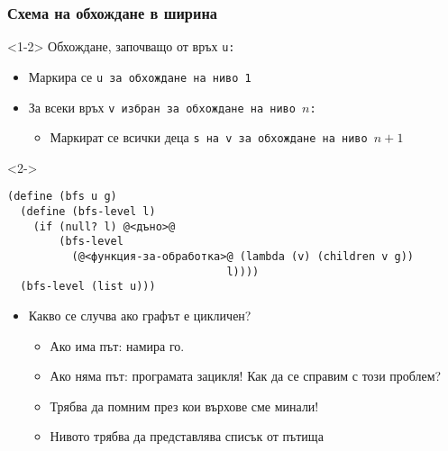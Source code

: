 \documentclass{beamer}
\begin{document}
\begin{frame}[fragile]
  \frametitle{Схема на обхождане в ширина}

  \begin{onlyenv}<1-2>
    Обхождане, започващо от връх \tt u:
    \begin{itemize}
    \item Маркира се \tt u за обхождане на ниво 1
    \item За всеки връх \tt v избран за обхождане на ниво $n$:
      \begin{itemize}
      \item Маркират се всички деца \tt s на \tt v за обхождане на
        ниво $n+1$
      \end{itemize}
    \end{itemize}
  \end{onlyenv}
  \begin{visibleenv}<2->
\small
\begin{lstlisting}
(define (bfs u g)
  (define (bfs-level l)
    (if (null? l) @<дъно>@
        (bfs-level
          (@<функция-за-обработка>@ (lambda (v) (children v g))
                                  l))))
  (bfs-level (list u)))
\end{lstlisting}
  \end{visibleenv}
  \begin{itemize}[<+(3)->]
  \item \alert{Какво се случва ако графът е цикличен?}
    \begin{itemize}
    \item Ако има път: намира го.
    \item Ако няма път: програмата зацикля! Как да се справим с този проблем?
    \item Трябва да помним през кои върхове сме минали!
    \item Нивото трябва да представлява \alert{списък от пътища}
    \end{itemize}
  \end{itemize}
\end{frame}
\end{document}

